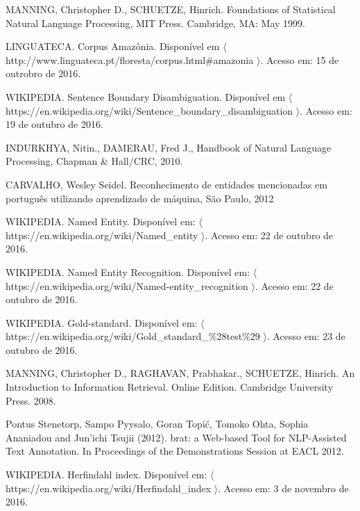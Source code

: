 \documentclass[11pt]{report}
\begin{document}
\begin{enumerate}[label={[\arabic*]}]
\item MANNING, Christopher D., SCHUETZE, Hinrich. Foundations of Statistical Natural Language Processing, MIT Press. Cambridge, MA: May 1999.
\item LINGUATECA. Corpus Amazônia. Disponível em $\langle$ http://www.linguateca.pt/floresta/\newline corpus.html\#amazonia $\rangle$. Acesso em: 15 de outrobro de 2016.
\item WIKIPEDIA. Sentence Boundary Disambiguation. Disponível em \newline$\langle$ https://en.wikipedia.org/wiki/Sentence\_boundary\_disambiguation $\rangle$. Acesso em: 19 de outubro de 2016.
\item INDURKHYA, Nitin., DAMERAU, Fred J., Handbook of Natural Language Processing, Chapman \& Hall/CRC, 2010.
\item CARVALHO, Wesley Seidel. Reconhecimento de entidades mencionadas em português utilizando aprendizado de máquina, São Paulo, 2012
\item WIKIPEDIA. Named Entity. Disponível em: $\langle$ https://en.wikipedia.org/wiki/Named\_entity $\rangle$. Acesso em: 22 de outubro de 2016.
\item WIKIPEDIA. Named Entity Recognition. Disponível em: \newline$\langle$ https://en.wikipedia.org/wiki/Named-entity\_recognition $\rangle$. Acesso em: 22 de outubro de 2016.
\item WIKIPEDIA. Gold-standard. Disponível em: \newline$\langle$ https://en.wikipedia.org/wiki/Gold\_standard\_\%28test\%29 $\rangle$. Acesso em: 23 de outubro de 2016.
\item MANNING, Christopher D., RAGHAVAN, Prabhakar., SCHUETZE, Hinrich. An Introduction to Information Retrieval. Online Edition. Cambridge University Press. 2008.
\item Pontus Stenetorp, Sampo Pyysalo, Goran Topić, Tomoko Ohta, Sophia Ananiadou and Jun'ichi Tsujii (2012). brat: a Web-based Tool for NLP-Assisted Text Annotation. In Proceedings of the Demonstrations Session at EACL 2012.
\item WIKIPEDIA. Herfindahl index. Disponível em: $\langle$ https://en.wikipedia.org/wiki/Herfindahl\newline\_index $\rangle$. Acesso em: 3 de novembro de 2016.
\end{enumerate}
\end{document}
